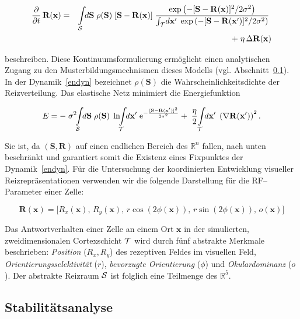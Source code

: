 \begin{eqnarray}
    \frac{\partial}{\partial t}\, \mathbf{R(x)} &=&\int\limits_{\cal
        S}\!\!d\mathbf{S}\; \rho(\mathbf{S})\; [\mathbf{S-R(x)}]\;
    \frac{\exp\left(-[\mathbf{S-R(x)}]^2/2\sigma^2\right)}{\int_{\cal T}
        \!d\mathbf{x}^\prime\; \exp\left(-[\mathbf{S-R(\mathbf{x}^\prime)}]^2/2\sigma^2\right)}\;\nonumber\\
    &&+\;\eta\,\Delta\mathbf{R(x)}
    \label{endyn}
\end{eqnarray}

beschreiben. Diese Kontinuumsformulierung ermöglicht einen analytischen
Zugang zu den Musterbildungsmechnismen dieses Modells
(vgl. Abschnitt~\ref{stabilitaet}). In der Dynamik~\eqref{endyn}
bezeichnet $\rho(\mathbf{S})$ die Wahrscheinlichkeitsdichte der
Reizverteilung. Das elastische Netz minimiert die Energiefunktion

\begin{equation}
    E=-\; \sigma^2\!\!\int\limits_{\cal S}\!\!d\mathbf{S}\; \rho(\mathbf{S})\;
    \ln\!\!\int\limits_{\cal T}\!\!d\mathbf{x}^\prime\;
    \text{e}^{-\frac{[\mathbf{S-R(\mathbf{x}^\prime)}]^2}{2\sigma^2}}+\;
    \frac{\eta}{2}\!\int\limits_{\cal T}\!\!d\mathbf{x}^\prime\;
    \left(\nabla\mathbf{R(\mathbf{x}^\prime)}\right)^2.
    \label{energie}
\end{equation}

Sie ist, da $(\mathbf{S,R})$ auf einen endlichen Bereich des $\mathbb{R}^n$
fallen, nach unten beschränkt und garantiert somit die Existenz eines
Fixpunktes der Dynamik~\eqref{endyn}. Für die Untersuchung der
koordinierten Entwicklung visueller Reizrepräsentationen verwenden wir die
folgende Darstellung für die RF--Parameter einer Zelle:

\begin{equation*}
    \mathbf{R(x)} = \bigl[R_x(\mathbf{x}),\, R_y(\mathbf{x}),\,
        r\cos(2\phi(\mathbf{x})),\, r\sin(2\phi(\mathbf{x})),\, o(\mathbf{x})\bigr]
\end{equation*}

Das Antwortverhalten einer Zelle an einem Ort $\mathbf{x}$ in der
simulierten, zweidimensionalen Cortexschicht $\cal T$ wird durch
fünf abstrakte Merkmale beschrieben: \emph{Position} ($R_x,R_y$) des
rezeptiven Feldes im visuellen Feld, \emph{Orientierungsselektivität}
($r$), \emph{bevorzugte Orientierung} ($\phi$) und \emph{Okulardominanz}
($o$). Der abstrakte Reizraum ${\cal S}$ ist folglich eine Teilmenge
des $\mathbb{R}^5$.

\subsection{Stabilitätsanalyse}
\label{stabilitaet}

